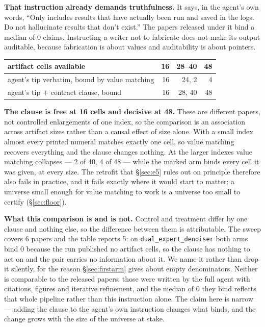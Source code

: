 \documentclass[10pt]{article}
\newcommand{\RM}[1]{{#1}}
\begin{document}
\textbf{That instruction already demands truthfulness.} It says, in the agent's
own words, ``Only includes results that have actually been run and saved in the
logs. Do not hallucinate results that don't exist.'' The papers released under
it bind a median of \RM{0} claims. Instructing a writer not to fabricate does
not make its output auditable, because fabrication is about values and
auditability is about pointers.

\begin{center}
\small
\begin{tabular}{@{}lrrr@{}}
\toprule
artifact cells available & \RM{16} & \RM{28--40} & \RM{48} \\
\midrule
agent's tip verbatim, bound by value matching & \RM{16} & \RM{24}, \RM{2} & \RM{4} \\
agent's tip $+$ contract clause, bound        & \RM{16} & \RM{28}, \RM{40} & \RM{48} \\
\bottomrule
\end{tabular}
\end{center}

\noindent \textbf{The clause is free at \RM{16} cells and decisive at \RM{48}.}
These are different papers, not controlled enlargements of one index, so the
comparison is an association across artifact sizes rather than a causal effect of
size alone. With a small index almost every printed numeral matches exactly one
cell, so value matching recovers everything and the clause changes nothing. At
the larger indexes value matching collapses --- \RM{2} of \RM{40}, \RM{4} of
\RM{48} --- while the marked arm binds every cell it was given, at every size. The retrofit that \S\ref{sec:e5} rules out on principle therefore
also fails in practice, and it fails exactly where it would start to matter:
a universe small enough for value matching to work is a universe too small to
certify (\S\ref{sec:floor}).

\textbf{What this comparison is and is not.} Control and treatment differ by one
clause and nothing else, so the difference between them is attributable. The
sweep covers \RM{6} papers and the table reports \RM{5}: on
\texttt{dual\_expert\_denoiser} both arms bind \RM{0} because the run published
no artifact cells, so the clause has nothing to act on and the pair carries no
information about it. We name it rather than drop it silently, for the reason
\S\ref{sec:firstarm} gives about empty denominators. Neither
is comparable to the released papers: those were written by the full agent with
citations, figures and iterative refinement, and the median of \RM{0} they bind
reflects that whole pipeline rather than this instruction alone. The claim here
is narrow --- adding the clause to the agent's own instruction changes what
binds, and the change grows with the size of the universe at stake.
\end{document}
